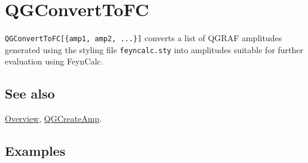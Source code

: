 \documentclass[../FeynHelpersManual.tex]{subfiles}
\begin{document}
\hypertarget{qgconverttofc}{
\section{QGConvertToFC}\label{qgconverttofc}}

\texttt{QGConvertToFC[\allowbreak{}\{\allowbreak{}amp1,\ \allowbreak{}amp2,\ \allowbreak{}...\}]}
converts a list of QGRAF amplitudes generated using the styling file
\texttt{feyncalc.sty} into amplitudes suitable for further evaluation
using FeynCalc.

\subsection{See also}

\hyperlink{toc}{Overview}, \hyperlink{qgcreateamp}{QGCreateAmp}.

\subsection{Examples}
\end{document}

